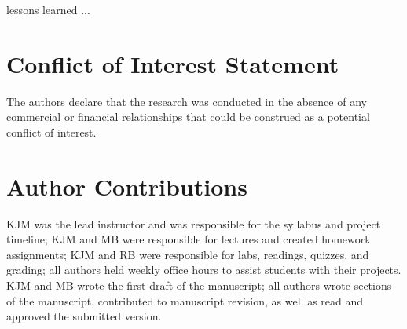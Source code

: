 lessons learned ...


\section*{Conflict of Interest Statement}

The authors declare that the research was conducted in the absence of any commercial or financial relationships that could be construed as a potential conflict of interest.

\section*{Author Contributions}

KJM was the lead instructor and was responsible for the syllabus and project timeline;
KJM and MB were responsible for lectures and created homework assignments;
KJM and RB were responsible for labs, readings, quizzes, and grading;
all authors held weekly office hours to assist students with their projects.
KJM and MB wrote the first draft of the manuscript;
all authors wrote sections of the manuscript, contributed to manuscript revision, 
as well as read and approved the submitted version.
